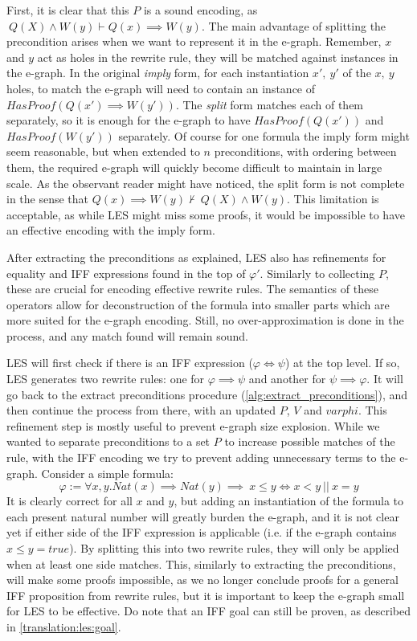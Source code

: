First, it is clear that this $P$ is a sound encoding, as $~Q(X) \wedge W(y) \vdash Q(x) \implies W(y)$.
The main advantage of splitting the precondition arises when we want to represent it in the e-graph.
Remember, $x$ and $y$ act as holes in the rewrite rule, they will be matched against instances in the e-graph.
In the original \emph{imply} form, for each instantiation $x',~y'$ of the $x,~y$ holes, to match the e-graph will need to contain an instance of $HasProof(Q(x') \implies W(y'))$.
The \emph{split} form matches each of them separately, so it is enough for the e-graph to have $HasProof(Q(x'))$ and $HasProof(W(y'))$ separately.
Of course for one formula the imply form might seem reasonable, but when extended to $n$ preconditions, with ordering between them, the required e-graph will quickly become difficult to maintain in large scale.
As the observant reader might have noticed, the split form is not complete in the sense that $Q(x) \implies W(y) \not \vdash ~Q(X) \wedge W(y)$.
This limitation is acceptable, as while LES might miss some proofs, it would be impossible to have an effective encoding with the imply form.

After extracting the preconditions as explained, LES also has refinements for equality and IFF expressions found in the top of $\varphi'$.
Similarly to collecting $P$, these are crucial for encoding effective rewrite rules.
The semantics of these operators allow for deconstruction of the formula into smaller parts which are more suited for the e-graph encoding.
Still, no over-approximation is done in the process, and any match found will remain sound.

LES will first check if there is an IFF expression ($\varphi \iff \psi$) at the top level.
If so, LES generates two rewrite rules: one for $\varphi \implies \psi$ and another for $\psi \implies \varphi$.
It will go back to the extract preconditions procedure (\autoref{alg:extract_preconditions}), and then continue the process from there, with an updated $P$, $V$ and $varphi$.
This refinement step is mostly useful to prevent e-graph size explosion.
While we wanted to separate preconditions to a set $P$ to increase possible matches of the rule, with the IFF encoding we try to prevent adding unnecessary terms to the e-graph.
Consider a simple formula:
\[
\varphi := \forall x,y.Nat(x) \implies Nat(y) \implies ~x \leq y \iff x < y~||~x = y
\]
It is clearly correct for all $x$ and $y$, but adding an instantiation of the formula to each present natural number will greatly burden the e-graph, and it is not clear yet if either side of the IFF expression is applicable (i.e. if the e-graph contains $x \leq y = true$).
By splitting this into two rewrite rules, they will only be applied when at least one side matches.
This, similarly to extracting the preconditions, will make some proofs impossible, as we no longer conclude proofs for a general IFF proposition from rewrite rules, but it is important to keep the e-graph small for LES to be effective.
Do note that an IFF goal can still be proven, as described in \autoref{translation:les:goal}.

